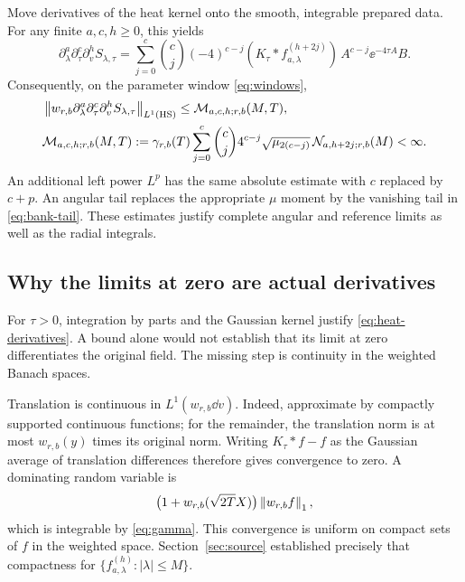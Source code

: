Move derivatives of the heat kernel onto the smooth, integrable prepared
data. For any finite $a,c,h\ge0$, this yields
\begin{equation}
 \partial_\lambda^a\partial_\tau^c\partial_v^hS_{\lambda,\tau}
 =\sum_{j=0}^c\binom cj(-4)^{c-j}
 (K_\tau*f_{a,\lambda}^{(h+2j)})\,
 A^{c-j}\ee^{-4\tau A}B.
 \label{eq:heat-derivatives}
\end{equation}
Consequently, on the parameter window \eqref{eq:windows},
\begin{align}
 &\left\lVert w_{r,b}\partial_\lambda^a\partial_\tau^c
                  \partial_v^hS_{\lambda,\tau}\right\rVert_{L^1(\operatorname{HS})}
 \le\mathcal M_{a,c,h;r,b}(M,T),
 \label{eq:heat-majorant}\\
 &\mathcal M_{a,c,h;r,b}(M,T)
 :=\gamma_{r,b}(T)\sum_{j=0}^c\binom cj4^{c-j}
       \sqrt{\mu_{2(c-j)}}\,
       \mathcal N_{a,h+2j;r,b}(M)<\infty.
 \label{eq:M-definition}
\end{align}
An additional left power $L^p$ has the same absolute estimate with $c$
replaced by $c+p$. An angular tail replaces the appropriate $\mu$
moment by the vanishing tail in \eqref{eq:bank-tail}. These estimates
justify complete angular and reference limits as well as the radial
integrals.

\subsection{Why the limits at zero are actual derivatives}

For $\tau>0$, integration by parts and the Gaussian kernel justify
\eqref{eq:heat-derivatives}. A bound alone would not establish that
its limit at zero differentiates the original field. The missing step
is continuity in the weighted Banach spaces.

Translation is continuous in $L^1(w_{r,b}\dd v)$. Indeed, approximate
by compactly supported continuous functions; for the remainder, the
translation norm is at most $w_{r,b}(y)$ times its original norm.
Writing $K_\tau*f-f$ as the Gaussian average of translation differences
therefore gives convergence to zero. A dominating random variable is
\begin{equation*}
 \bigl(1+w_{r,b}(\sqrt{2T}X)\bigr)\left\lVert w_{r,b}f\right\rVert_1,
\end{equation*}
which is integrable by \eqref{eq:gamma}. This convergence is uniform on
compact sets of $f$ in the weighted space. Section~\ref{sec:source}
established precisely that compactness for
$\{f_{a,\lambda}^{(h)}:|\lambda|\le M\}$.

